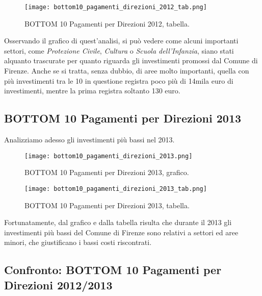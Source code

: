 			\begin{figure}[h!]
				\centering
					\texttt{[image: bottom10\_pagamenti\_direzioni\_2012\_tab.png]}
				\caption{BOTTOM 10 Pagamenti per Direzioni 2012, tabella.}
				\label{fig:bottom10_pagamenti_direzioni_2012_tab}
			\end{figure}
			
			Osservando il grafico di quest'analisi, si può vedere come alcuni importanti settori, come \textit{Protezione Civile}, \textit{Cultura} o \textit{Scuola dell'Infanzia}, siano stati alquanto trascurate per quanto riguarda gli investimenti promossi dal Comune di Firenze. Anche se si tratta, senza dubbio, di aree molto importanti, quella con più investimenti tra le 10 in questione registra poco più di 14mila euro di investimenti, mentre la prima registra soltanto 130 euro.
			
			\FloatBarrier
		
		\subsection{BOTTOM 10 Pagamenti per Direzioni 2013} \label{subsec:bottom_pagamenti_direzioni_2013}
		
			Analizziamo adesso gli investimenti più bassi nel 2013.
		
			\begin{figure}[h!]
				\centering
					\texttt{[image: bottom10\_pagamenti\_direzioni\_2013.png]}
				\caption{BOTTOM 10 Pagamenti per Direzioni 2013, grafico.}
				\label{fig:bottom10_pagamenti_direzioni_2013}
			\end{figure}
			
			\begin{figure}[h!]
				\centering
					\texttt{[image: bottom10\_pagamenti\_direzioni\_2013\_tab.png]}
				\caption{BOTTOM 10 Pagamenti per Direzioni 2013, tabella.}
				\label{fig:bottom10_pagamenti_direzioni_2013_tab}
			\end{figure}
			
			Fortunatamente, dal grafico e dalla tabella risulta che durante il 2013 gli investimenti più bassi del Comune di Firenze sono relativi a settori ed aree minori, che giustificano i bassi costi riscontrati.
			
			\FloatBarrier
		
		\subsection{Confronto: BOTTOM 10 Pagamenti per Direzioni 2012/2013} \label{subsec:bottom_pagamenti_direzioni_2012/2013}
	
